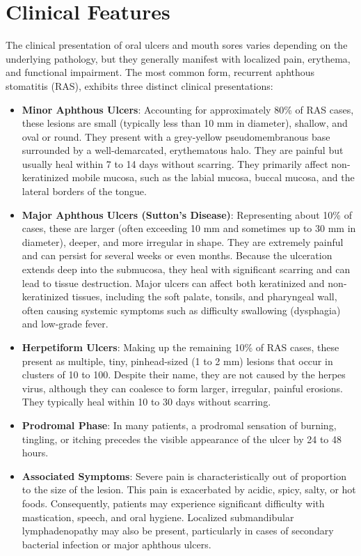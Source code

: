 \section*{Clinical Features}
The clinical presentation of oral ulcers and mouth sores varies depending on the underlying pathology, but they generally manifest with localized pain, erythema, and functional impairment. The most common form, recurrent aphthous stomatitis (RAS), exhibits three distinct clinical presentations:
\begin{itemize}
    \item \textbf{Minor Aphthous Ulcers}: Accounting for approximately 80\% of RAS cases, these lesions are small (typically less than 10 mm in diameter), shallow, and oval or round. They present with a grey-yellow pseudomembranous base surrounded by a well-demarcated, erythematous halo. They are painful but usually heal within 7 to 14 days without scarring. They primarily affect non-keratinized mobile mucosa, such as the labial mucosa, buccal mucosa, and the lateral borders of the tongue.
    \item \textbf{Major Aphthous Ulcers (Sutton's Disease)}: Representing about 10\% of cases, these are larger (often exceeding 10 mm and sometimes up to 30 mm in diameter), deeper, and more irregular in shape. They are extremely painful and can persist for several weeks or even months. Because the ulceration extends deep into the submucosa, they heal with significant scarring and can lead to tissue destruction. Major ulcers can affect both keratinized and non-keratinized tissues, including the soft palate, tonsils, and pharyngeal wall, often causing systemic symptoms such as difficulty swallowing (dysphagia) and low-grade fever.
    \item \textbf{Herpetiform Ulcers}: Making up the remaining 10\% of RAS cases, these present as multiple, tiny, pinhead-sized (1 to 2 mm) lesions that occur in clusters of 10 to 100. Despite their name, they are not caused by the herpes virus, although they can coalesce to form larger, irregular, painful erosions. They typically heal within 10 to 30 days without scarring.
    \item \textbf{Prodromal Phase}: In many patients, a prodromal sensation of burning, tingling, or itching precedes the visible appearance of the ulcer by 24 to 48 hours.
    \item \textbf{Associated Symptoms}: Severe pain is characteristically out of proportion to the size of the lesion. This pain is exacerbated by acidic, spicy, salty, or hot foods. Consequently, patients may experience significant difficulty with mastication, speech, and oral hygiene. Localized submandibular lymphadenopathy may also be present, particularly in cases of secondary bacterial infection or major aphthous ulcers.
\end{itemize}

